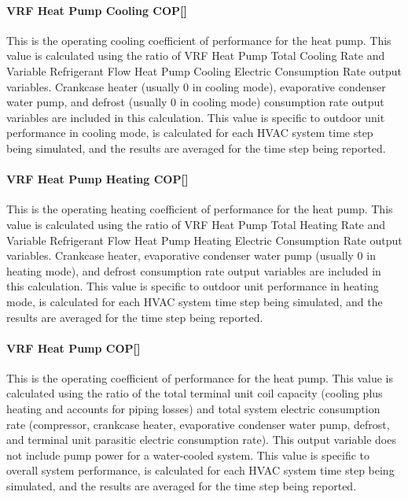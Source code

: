\paragraph{\texorpdfstring{VRF Heat Pump Cooling COP{[]}}{VRF Heat Pump Cooling COP}}\label{vrf-heat-pump-cooling-cop}

This is the operating cooling coefficient of performance for the heat pump. This value is calculated using the ratio of VRF Heat Pump Total Cooling Rate and Variable Refrigerant Flow Heat Pump Cooling Electric Consumption Rate output variables. Crankcase heater (usually 0 in cooling mode), evaporative condenser water pump, and defrost (usually 0 in cooling mode) consumption rate output variables are included in this calculation. This value is specific to outdoor unit performance in cooling mode, is calculated for each HVAC system time step being simulated, and the results are averaged for the time step being reported.

\paragraph{\texorpdfstring{VRF Heat Pump Heating COP{[]}}{VRF Heat Pump Heating COP}}\label{vrf-heat-pump-heating-cop}

This is the operating heating coefficient of performance for the heat pump. This value is calculated using the ratio of VRF Heat Pump Total Heating Rate and Variable Refrigerant Flow Heat Pump Heating Electric Consumption Rate output variables. Crankcase heater, evaporative condenser water pump (usually 0 in heating mode), and defrost consumption rate output variables are included in this calculation. This value is specific to outdoor unit performance in heating mode, is calculated for each HVAC system time step being simulated, and the results are averaged for the time step being reported.

\paragraph{\texorpdfstring{VRF Heat Pump COP{[]}}{VRF Heat Pump COP}}\label{vrf-heat-pump-cop}

This is the operating coefficient of performance for the heat pump. This value is calculated using the ratio of the total terminal unit coil capacity (cooling plus heating and accounts for piping losses) and total system electric consumption rate (compressor, crankcase heater, evaporative condenser water pump, defrost, and terminal unit parasitic electric consumption rate). This output variable does not include pump power for a water-cooled system. This value is specific to overall system performance, is calculated for each HVAC system time step being simulated, and the results are averaged for the time step being reported.

